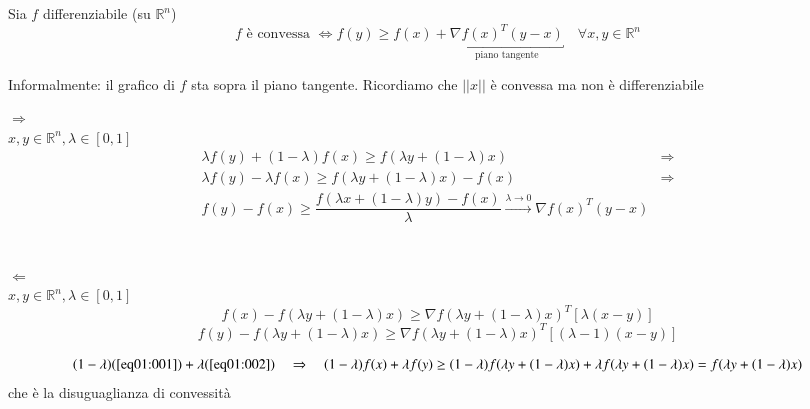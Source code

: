 \begin{theo}
\label{richiamibigi:theo01}
 Sia $f$ differenziabile (su $\mathbb{R}^{n}$)
 $$  f \text{  è convessa } \Longleftrightarrow f(y) \geq  f(x) + \underbracket{ \nabla f(x)^{T} (y-x)}_{\text{piano tangente}} \quad \forall x, y \in \mathbb{R}^{n}$$
\end{theo}
 Informalmente: il grafico di $f$ sta sopra il piano tangente.
 Ricordiamo che $||x||$ è convessa ma non è differenziabile
\begin{thproof} $\Longrightarrow$ \\ $x,y \in \mathbb{R}^{n}, \lambda
\in [0,1]$ \\
$$
\begin{array}{ll}
\lambda f(y) + (1- \lambda) f(x)  \geq f(\lambda y + (1-\lambda)x)  & \Rightarrow \\
   \lambda f(y) -  \lambda f(x)  \geq f(\lambda y + (1-\lambda)x) -f(x) & \Rightarrow \\
   f(y) -  f(x)  \geq \dfrac{f(\lambda x + (1-\lambda)y) -f(x)}{\lambda}  \xrightarrow{\lambda \to 0} 
 \nabla f(x)^{T} (y-x) &
\end{array} 
$$
  \\ \\
 $\Longleftarrow$ \\
  $x,y \in \mathbb{R}^{n}, \lambda \in [0,1]$ \\
  \begin{equation}
    \label{eq01:001}    
f(x) - f(\lambda y + (1-\lambda)x) \geq 
  \nabla f(\lambda y  + (1 - \lambda)x)^{T}[\lambda(x-y)]
  \end{equation}
  \begin{equation}
    \label{eq01:002}    
f(y) - f(\lambda y + (1-\lambda)x ) \geq 
  \nabla f(\lambda y  + (1 - \lambda)x)^{T}[(\lambda -1)(x-y)]
  \end{equation}


$$(1-\lambda) (\ref{eq01:001}) 
+ \lambda (\ref{eq01:002})
\quad \Rightarrow \quad 
(1-\lambda) f(x) + \lambda f(y) \geq
(1-\lambda)f(\lambda y + (1-\lambda)x) + \lambda f(\lambda y +
(1-\lambda)x) = f(\lambda y + (1-\lambda)x)
$$
che è la disuguaglianza di convessità
\end{thproof}
